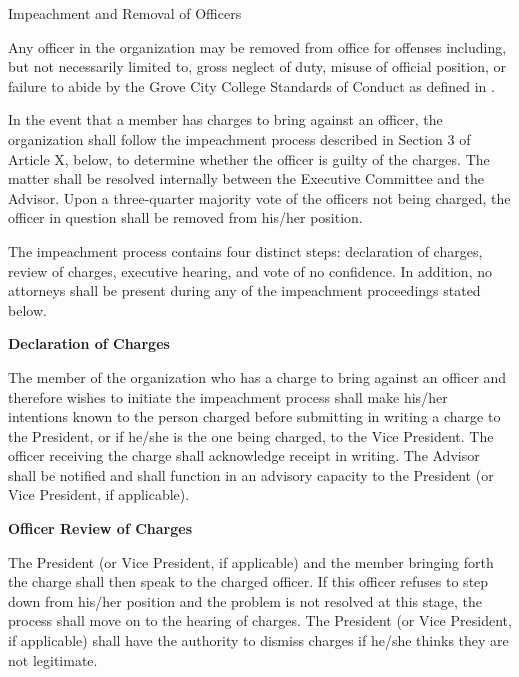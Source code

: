 {
\begin{article}{Impeachment and Removal of Officers}
	\item Any officer in the organization may be removed from office for offenses including, but not necessarily limited to, gross neglect of duty, misuse of official position, or failure to abide by the Grove City College Standards of Conduct as defined in \crimson.
	\item In the event that a member has charges to bring against an officer, the organization shall follow the impeachment process described in Section 3 of Article X, below, to determine whether the officer is guilty of the charges. The matter shall be resolved internally between the Executive Committee and the Advisor. Upon a three-quarter majority vote of the officers not being charged, the officer in question shall be removed from his/her position.
	\item The impeachment process contains four distinct steps: declaration of charges, review of charges, executive hearing, and vote of no confidence.  In addition, no attorneys shall be present during any of the impeachment proceedings stated below.

	\hypertarget{Declaration of Charges}{}
	\textbf{Declaration of Charges}

	The member of the organization who has a charge to bring against an officer and therefore wishes to initiate the impeachment process shall make his/her intentions known to the person charged before submitting in writing a charge to the President, or if he/she is the one being charged, to the Vice President. The officer receiving the charge shall acknowledge receipt in writing. The Advisor shall be notified and shall function in an advisory capacity to the President (or Vice President, if applicable).

	\hypertarget{Officer Review of Charges}{}
	\textbf{Officer Review of Charges}

	The President (or Vice President, if applicable) and the member bringing forth the charge shall then speak to the charged officer. If this officer refuses to step down from his/her position and the problem is not resolved at this stage, the process shall move on to the hearing of charges. The President (or Vice President, if applicable) shall have the authority to dismiss charges if he/she thinks they are not legitimate.


\end{article}}
